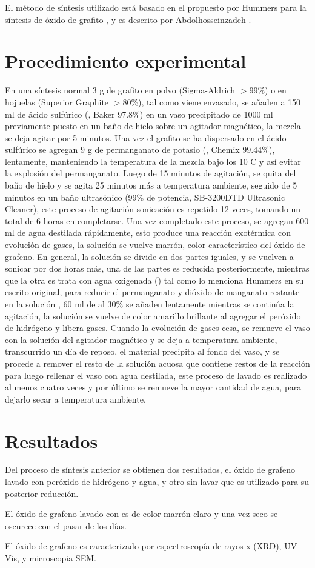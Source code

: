 El método de síntesis utilizado está basado en el propuesto por Hummers para la síntesis de óxido de grafito \citep{Hummers1958}, y es descrito por Abdolhosseinzadeh \citep{Abdolhosseinzadeh2015}.

\section{Procedimiento experimental}
En una síntesis normal 3 g de grafito en polvo (Sigma-Aldrich $>$99\%) o en hojuelas (Superior Graphite $>$80\%), tal como viene envasado, se añaden a 150 ml de ácido sulfúrico (, Baker 97.8\%) en un vaso precipitado de 1000 ml previamente puesto en un baño de hielo sobre un agitador magnético, la mezcla se deja agitar por 5 minutos. Una vez el grafito se ha dispersado en el ácido sulfúrico se agregan 9 g de permanganato de potasio (, Chemix 99.44\%), lentamente, manteniendo la temperatura de la mezcla bajo los 10 C y así evitar la explosión del permanganato. Luego de 15 minutos de agitación, se quita del baño de hielo y se agita 25 minutos más a temperatura ambiente, seguido de 5 minutos en un baño ultrasónico (99\% de potencia, SB-3200DTD Ultrasonic Cleaner), este proceso de agitación-sonicación es repetido 12 veces, tomando un total de 6 horas en completarse. Una vez completado este proceso, se agregan 600 ml de agua destilada rápidamente, esto produce una reacción exotérmica con evolución de gases, la solución se vuelve marrón, color característico del óxido de grafeno. En general, la solución se divide en dos partes iguales, y se vuelven a sonicar por dos horas más, una de las partes es reducida posteriormente, mientras que la otra es trata con agua oxigenada () tal como lo menciona Hummers en su escrito original, para reducir el permanganato y dióxido de manganato restante en la solución \citep{Hummers1958}, 60 ml de  al 30\% se añaden lentamente mientras se continúa la  agitación, la solución se vuelve de color amarillo brillante al agregar el peróxido de hidrógeno y libera gases. Cuando la evolución de gases cesa, se remueve el vaso con la solución del agitador magnético y se deja a temperatura ambiente, transcurrido un día de reposo, el material precipita al fondo del vaso, y se procede a remover el resto de la solución acuosa que contiene restos de la reacción para luego rellenar el vaso con agua destilada, este proceso de lavado es realizado al menos cuatro veces y por último se remueve la mayor cantidad de agua, para dejarlo secar a temperatura ambiente.

\section{Resultados}
Del proceso de síntesis anterior se obtienen dos resultados, el óxido de grafeno lavado con peróxido de hidrógeno y agua, y otro sin lavar que es utilizado para su posterior reducción.

El óxido de grafeno lavado con  es de color marrón claro y una vez seco se oscurece con el pasar de los días.

El óxido de grafeno es caracterizado por espectroscopía de rayos x (XRD), UV-Vis, y microscopia SEM.
